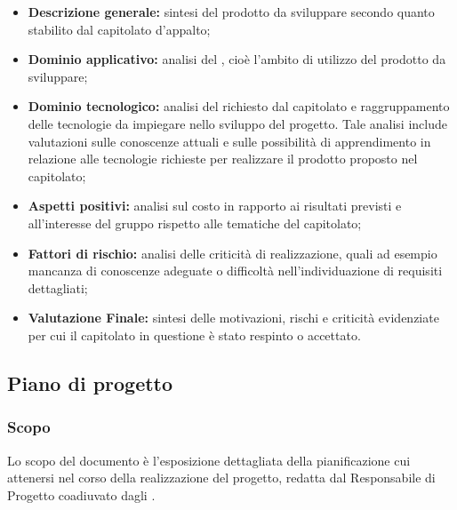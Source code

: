 \documentclass[../NormediProgetto.tex]{subfiles}
\begin{document}
\begin{itemize}
    \item \textbf{Descrizione generale:} sintesi del prodotto da sviluppare secondo quanto stabilito dal capitolato d'appalto;
    
    \item \textbf{Dominio applicativo:} analisi del , cioè l'ambito di utilizzo del prodotto da sviluppare;
    
    \item \textbf{Dominio tecnologico:} analisi del  richiesto dal capitolato e raggruppamento delle tecnologie da impiegare nello sviluppo del progetto. Tale analisi include valutazioni sulle conoscenze attuali e sulle possibilità di apprendimento in relazione alle tecnologie richieste per realizzare il prodotto proposto nel capitolato;
    
    \item \textbf{Aspetti positivi:} analisi sul costo in rapporto ai risultati previsti e all’interesse del gruppo rispetto alle tematiche del capitolato;
    
    \item \textbf{Fattori di rischio:} analisi delle criticità di realizzazione, quali ad esempio mancanza di conoscenze adeguate o difficoltà nell’individuazione di requisiti dettagliati;
    
    \item \textbf{Valutazione Finale:} sintesi delle motivazioni, rischi e criticità evidenziate per cui il capitolato in questione è stato respinto o accettato.
\end{itemize}


\subsection{Piano di progetto}

\subsubsection{Scopo}
Lo scopo del documento è l'esposizione dettagliata della pianificazione cui attenersi nel corso della realizzazione del progetto, redatta dal Responsabile di Progetto coadiuvato dagli . 
\end{document}
